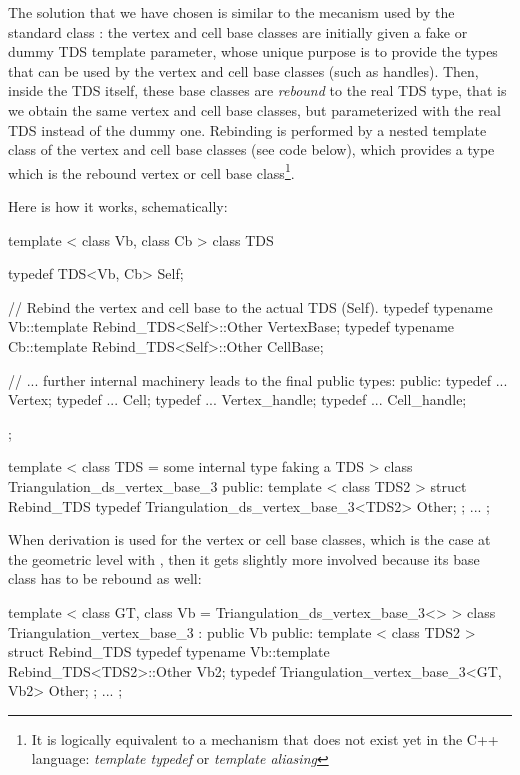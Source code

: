 The solution that we have chosen is similar to the mecanism used by the
standard class : the vertex and cell base classes are
initially given a fake or dummy TDS template parameter, whose unique purpose
is to provide the types that can be used by the vertex and cell base classes
(such as handles).  Then, inside the TDS itself, these base classes are
\textit{rebound} to the real TDS type, that is we obtain the same vertex
and cell base classes, but parameterized with the real TDS instead of the dummy
one.  Rebinding is performed by a nested template class of the vertex and cell
base classes (see code below), which provides a type which is the rebound
vertex or cell base class\footnote{It is logically equivalent to a mechanism
that does not exist yet in the C++ language: \textit{template typedef} or
\textit{template aliasing}}.

Here is how it works, schematically:

\begin{ccExampleCode}
template < class Vb, class Cb >
class TDS
{
  typedef TDS<Vb, Cb>    Self;

  // Rebind the vertex and cell base to the actual TDS (Self).
  typedef typename Vb::template Rebind_TDS<Self>::Other  VertexBase;
  typedef typename Cb::template Rebind_TDS<Self>::Other  CellBase;

  // ... further internal machinery leads to the final public types:
public:
  typedef ...  Vertex;
  typedef ...  Cell;
  typedef ...  Vertex_handle;
  typedef ...  Cell_handle;
};

template < class TDS = some internal type faking a TDS >
class Triangulation_ds_vertex_base_3
{
public:
  template < class TDS2 >
  struct Rebind_TDS {
    typedef Triangulation_ds_vertex_base_3<TDS2>    Other;
  };
...
};
\end{ccExampleCode}

When derivation is used for the vertex or cell base classes, which is the
case at the geometric level with , then
it gets slightly more involved because its base class has to be rebound as
well:

\begin{ccExampleCode}
template < class GT, class Vb = Triangulation_ds_vertex_base_3<> >
class Triangulation_vertex_base_3 : public Vb
{
public:
  template < class TDS2 >
  struct Rebind_TDS {
    typedef typename Vb::template Rebind_TDS<TDS2>::Other  Vb2;
    typedef Triangulation_vertex_base_3<GT, Vb2>           Other;
  };
...
};
\end{ccExampleCode}

